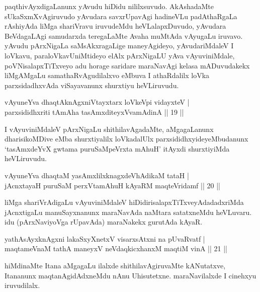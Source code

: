 \begin{artha}%
paqthivAyxdigaLanunx yAvudu hiDidu nililxsuvudo. AkAshadaMte sUkaSxmXvAgiruvudo yAvudara savxrUpavAgi hadineVLu padAthaRgaLa rAshiyAda liMga shariVravu iruvudeMdu heVLalapxDuvudo, yAvudara BeVdagaLAgi samudarxda teregaLaMte  Avaha muMtAda vAyugaLu iruvavo. yAvudu pArxNigaLa saMsAkxragaLige maneyAgideyo, yAvudariMdaleV I loVkavu, paraloVkavU\break niMtideyo elAlx pArxNigaLU yAva vAyuviniMdale, poVNisalapxTiTxveyo adu horage saridare maraNavAgi kelasa mADuvudakekx liMgAMgaLu samathaRvAgudilalxvo eMbuva I athaRdalilx loVka parxsidadhxvAda viSayavanunx shurxtiyu heVLiruvudu. 
\end{artha}

\begin{shl}
vAyuneYva dhaqtAknAgxniVtayxtarx loVkeV\s pi vidayxteV |\\
parxsididhxriti tAmAha tasAmxditeyxVvamAdinA \hfill || 19 ||
\end{shl}

\begin{artha}%
I vAyuviniMdaleV pArxNigaLu shithilavAgadaMte, aMgagaLanunx dharisikoMDive eMba shurxtiyalilx loVkadalUlx parxsididhxyideyeMbudanunx `tasAmxdeYvX gwtama puruSaMpeVrxta mAhuH' itAyxdi shurxtiyiMda heVLiruvudu.
\end{artha}


\begin{shl}
vAyuneYva dhaqtaM yasAmxlilxknagxdeVhAdikaM tataH |\\
jAcnxtayaH puruSaM perxVtamAhuH kAyaRM maqteVridamf \hfill || 20 ||
\end{shl}
\newpage
\begin{artha}
liMga shariVrAdigaLu vAyuviniMdaleV hiDidirisalapxTiTxveyAdadadx\-riMda jAcnxtigaLu manuSayxnanunx maraNavAda naMtara satatxneMdu heVLuvaru. idu (pArxNaviyoVga rUpavAda) maraNakekx gurutAda kAyaR.
\end{artha}


\begin{shl}
yathA\s sAyxknAgxni lakaSxyXnetxV visarxsAtxni na pUvaRvatf |\\
maqtameVnaM tathA maneyxV neVdaqkicxhanxM maqtiM vinA \hfill || 21 ||
\end{shl}

\begin{artha}
hiMdinaMte Itana aMgagaLu ilalxde shithilavAgiruvaMte kANutatxve, Itananunx maqtanAgidAdxneMdu nAnu Uhisutetxne. maraNavilalxde I cinehxyu iruvudilalx.
\end{artha}

